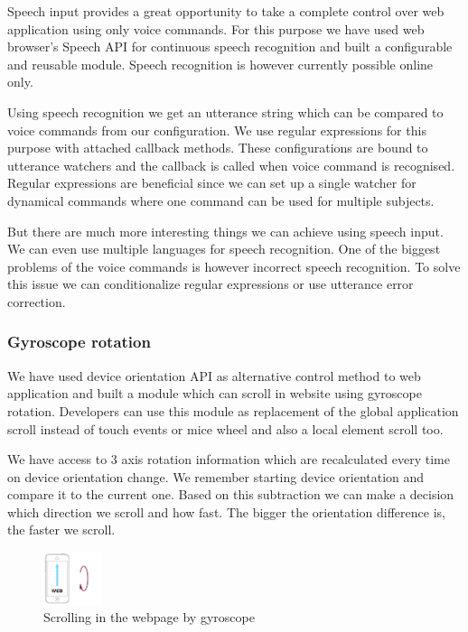 \documentclass{iitsrc}
\begin{document}
Speech input provides a great opportunity to take a complete control over web application using only voice commands. For this purpose we have used web browser's Speech API for continuous speech recognition and built a configurable and reusable module. Speech recognition is however currently possible online only.

Using speech recognition we get an utterance string which can be compared to voice commands from our configuration. We use regular expressions for this purpose with attached callback methods. These configurations are bound to utterance watchers and the callback is called when voice command is recognised. Regular expressions are beneficial since we can set up a single watcher for dynamical commands where one command can be used for multiple subjects.

But there are much more interesting things we can achieve using speech input. We can even use multiple languages for speech recognition. One of the biggest problems of the voice commands is however incorrect speech recognition. To solve this issue we can conditionalize regular expressions or use utterance error correction.


\subsubsection*{Gyroscope rotation} %
\label{ssub:gyroscope_rotation}

We have used device orientation API as alternative control method to web application and built a module which can scroll in website using gyroscope rotation. Developers can use this module as replacement of the global application scroll instead of touch events or mice wheel and also a local element scroll too.

We have access to 3 axis rotation information which are recalculated every time on device orientation change. We remember starting device orientation and compare it to the current one. Based on this subtraction we can make a decision which direction we scroll and how fast. The bigger the orientation difference is, the faster we scroll.

\begin{figure}[ht]
    \begin{center}
        \includegraphics[width=0.15\textwidth]{../images/gyroscope}
        \caption{Scrolling in the webpage by gyroscope}
        \label{fig:gyroscope}
    \end{center}
\end{figure}
\end{document}
